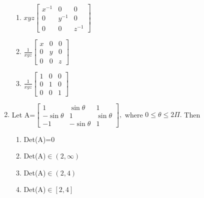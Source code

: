 \begin{enumerate}[label=\arabic*.,ref=\thesubsection.\theenumi]
\begin{enumerate}
\item $xyz\begin{bmatrix} x^{-1}&0&0 \\ 0&y^{-1}&0 \\ 0&0&z^{-1} \end{bmatrix}$ 
\item $\frac{1}{xyz}\begin{bmatrix} x&0&0 \\ 0&y&0 \\ 0&0&z \end{bmatrix}$ 
\item $\frac{1}{xyz}\begin{bmatrix} 1&0&0 \\ 0&1&0 \\ 0&0&1 \end{bmatrix}$ 
\end{enumerate}
\item Let 
A=$\begin{bmatrix}
1&\sin\theta&1 \\ -\sin\theta&1&\sin\theta \\ -1&-\sin\theta&1
\end{bmatrix},$ 
where $0\leq \theta \leq 2\Pi.$ Then
\begin{enumerate}
\item Det(A)=0
\item Det(A)$\in(2,\infty)$
\item Det(A)$\in (2,4)$
\item Det(A)$\in [2,4]$
\end{enumerate}
\end{enumerate}
    
